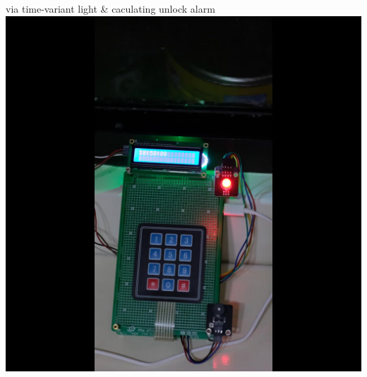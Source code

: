\begin{cventries}
  \cventry
    {via time-variant light \& caculating unlock alarm\linebreak[1]\includegraphics[scale=0.2, left]{refreshing-clock.jpg}}
    {\href{https://github.com/chencyutku/refreshing-clock}{\color{hyperlink}{Refreshin Clock(link)}}}
    {}{}{}

\end{cventries}
